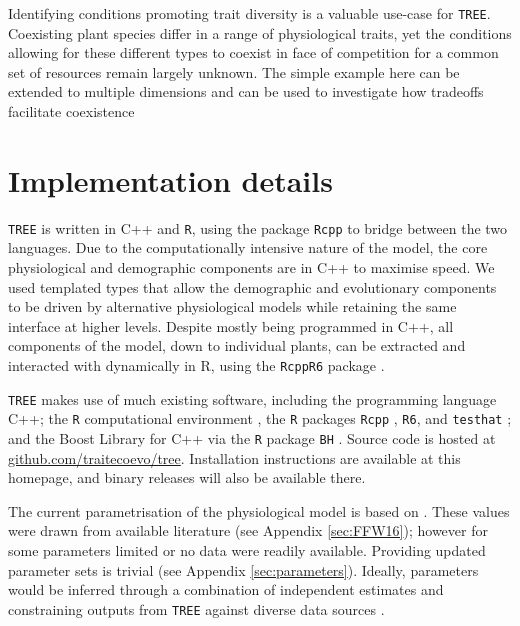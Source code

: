 \documentclass[a4paper,11pt]{article}
\begin{document}
Identifying conditions promoting trait diversity is a valuable use-case
for \texttt{TREE}. Coexisting plant species differ in a range of physiological
traits, yet the conditions allowing for these different types to coexist
in face of competition for a common set of resources remain largely
unknown. The simple example here can be extended to multiple dimensions
and can be used to investigate how tradeoffs facilitate coexistence
\citep{Falster-2015}

\section{Implementation details}

\texttt{TREE} is written in C++ and \texttt{R}, using the package \texttt{Rcpp}
\citep{Eddelbuettel-2011, Eddelbuettel-2013} to bridge between the two
languages. Due to the computationally intensive nature of the model, the
core physiological and demographic components are in C++ to maximise
speed. We used templated types that allow the demographic and evolutionary
components to be driven by alternative physiological models while
retaining the same interface at higher levels. Despite mostly being
programmed in C++, all components of the model, down to individual
plants, can be extracted and interacted with dynamically in R, using the
\texttt{RcppR6} package \citep{RcppR6}.

\texttt{TREE} makes use of much existing software, including the programming
language C++; the \texttt{R} computational environment \citep{R-2015}, the \texttt{R}
packages \texttt{Rcpp} \citep{Eddelbuettel-2011, Eddelbuettel-2013},
\texttt{R6}\citep{Chang-2014}, and \texttt{testhat}
\citep{Wickham-2011}; and the Boost Library for C++
\citep{Schaling-2014} via the \texttt{R} package \texttt{BH}
\citep{Eddelbuettel-2015}. Source code is hosted at
\href{https://github.com/traitecoevo/tree}{github.com/traitecoevo/tree}.
Installation instructions are available at this homepage, and binary
releases will also be available there.

The current parametrisation of the physiological model is based on
\citet{Falster-2011}. These values were drawn from available literature (see
Appendix \ref{sec:FFW16}); however for some parameters limited or no data were
readily available. Providing updated parameter sets is trivial (see Appendix
\ref{sec:parameters}). Ideally, parameters would be inferred through a combination of
independent estimates and constraining outputs from \texttt{TREE} against diverse data sources
\citep{Lebauer-2012, Keenan-2013}.
\end{document}
